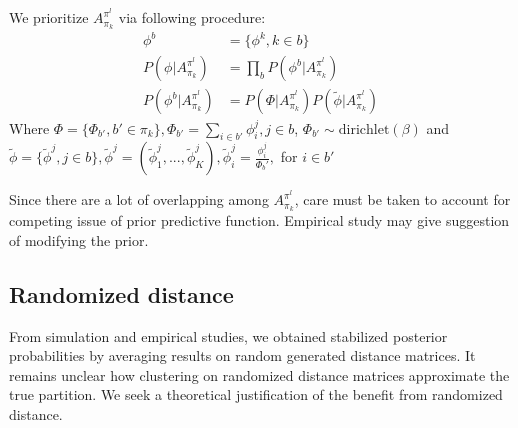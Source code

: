 \documentclass[11pt]{amsart}
\begin{document}
We prioritize $A_{\pi_k}^{\pi^l}$ via following procedure:
\begin{align}
\phi^b &= \{\phi^k, k \in b\}\\
P(\phi | A_{\pi_k}^{\pi^l}) &= \underset{b}\prod P(\phi^b | A_{\pi_k}^{\pi^l})\\
P(\phi^b | A_{\pi_k}^{\pi^l}) &= P(\Phi | A_{\pi_k}^{\pi^l}) P(\tilde{\phi} |A_{\pi_k}^{\pi^l})
\end{align}
Where $\Phi = \{\Phi_{b'}, b' \in \pi_k\},  \Phi_{b'} = \underset{i\in b'}\sum\phi_i^j, j\in b$,  $\Phi_{b'} \sim \text{dirichlet}(\beta)$ and $\tilde{\phi} = \{\tilde{\phi}^j, j \in b\},
\tilde{\phi}^j = (\tilde{\phi}_1^j, ... , \tilde{\phi}_K^j), \tilde{\phi}_i^j = \frac{\phi_i^j}{\Phi_b'},$ for $ i \in b'$

Since there are a lot of overlapping among $A_{\pi_k}^{\pi^l}$, care must be taken to account for competing issue of prior predictive function. Empirical study may give suggestion of modifying the prior.

\subsection{Randomized distance}
From simulation and empirical studies, we obtained stabilized posterior probabilities by averaging results on random generated distance matrices. It remains unclear how clustering on randomized distance matrices approximate the true partition. We seek a theoretical justification of the benefit from randomized distance. 




\newpage
\appendix
\end{document}
